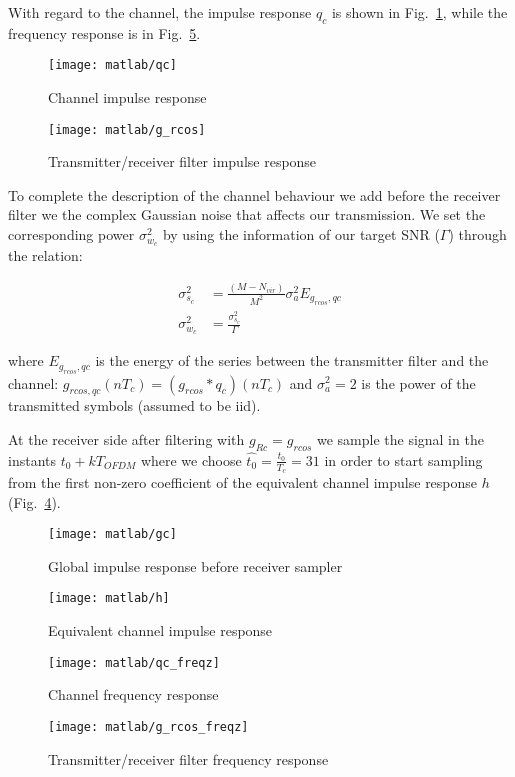 \documentclass[a4paper,oneside]{article}
\begin{document}
With regard to the channel, the impulse response $q_c$ is shown in Fig.~\ref{plot:qc}, while the frequency response is in Fig.~\ref{plot:qc_freqz}.
\begin{figure}[htbp]
  \centering
  \texttt{[image: matlab/qc]}
  \caption{Channel impulse response}
  \label{plot:qc}
\end{figure}
\begin{figure}[htbp]
  \centering
  \texttt{[image: matlab/g\_rcos]}
  \caption{Transmitter/receiver filter impulse response}
  \label{plot:g_rcos}
\end{figure}

To complete the description of the channel behaviour we add before the receiver filter we the complex Gaussian noise that affects our transmission. We set the corresponding power $\sigma_{w_c}^2$ by using the information of our target SNR ($\Gamma$) through the relation:

\begin{align}
  \sigma^2_{s_c} &= \frac{(M-N_{vir})}{M^2}\sigma_{a}^2 E_{g_{rcos},qc} \\
\sigma_{w_c}^2 &= \frac{\sigma^2_{s_c}}{\Gamma}
\label{eq:var_OFDM}
\end{align}

where $E_{g_{rcos},qc}$ is the energy of the series between the transmitter filter and the channel: $g_{rcos,qc}(nT_c) = \left(g_{rcos}*q_c\right)(nT_c)$ and $\sigma_a^2 = 2$ is the power of the transmitted symbols (assumed to be iid).

At the receiver side after filtering with $g_{Rc} = g_{rcos}$ we sample the signal in the instants $t_0 + kT_{OFDM}$ where we choose $\hat{t_0} = \frac{t_0}{T_c} = 31$ in order to start sampling from the first non-zero coefficient of the equivalent channel impulse response $h$ (Fig.~\ref{plot:h}).
\begin{figure}[htbp]
  \centering
  \texttt{[image: matlab/gc]}
  \caption{Global impulse response before receiver sampler}
  \label{plot:gc}
\end{figure}
\begin{figure}[htbp]
  \centering
  \texttt{[image: matlab/h]}
  \caption{Equivalent channel impulse response}
  \label{plot:h}
\end{figure}
\begin{figure}[htbp]
  \centering
  \texttt{[image: matlab/qc\_freqz]}
  \caption{Channel frequency response}
  \label{plot:qc_freqz}
\end{figure}
\begin{figure}[htbp]
  \centering
  \texttt{[image: matlab/g\_rcos\_freqz]}
  \caption{Transmitter/receiver filter frequency response}
  \label{plot:g_rcos_freqz}
\end{figure}
\end{document}
